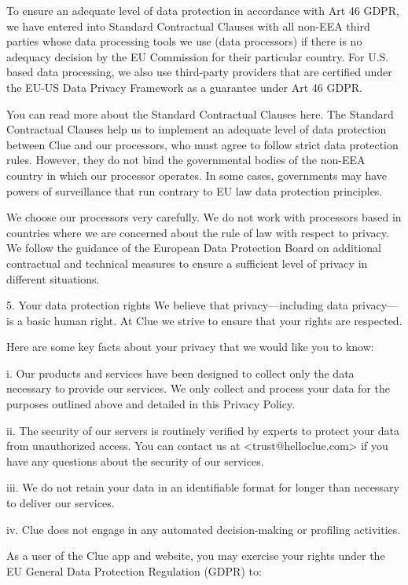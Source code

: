 To ensure an adequate level of data protection in accordance with Art 46 GDPR, we have entered into Standard Contractual Clauses with all non-EEA third parties whose data processing tools we use (data processors) if there is no adequacy decision by the EU Commission for their particular country. For U.S. based data processing, we also use third-party providers that are certified under the EU-US Data Privacy Framework as a guarantee under Art 46 GDPR.

You can read more about the Standard Contractual Clauses here. The Standard Contractual Clauses help us to implement an adequate level of data protection between Clue and our processors, who must agree to follow strict data protection rules. However, they do not bind the governmental bodies of the non-EEA country in which our processor operates. In some cases, governments may have powers of surveillance that run contrary to EU law data protection principles.

We choose our processors very carefully. We do not work with processors based in countries where we are concerned about the rule of law with respect to privacy. We follow the guidance of the European Data Protection Board on additional contractual and technical measures to ensure a sufficient level of privacy in different situations.

5. Your data protection rights
We believe that privacy—including data privacy—is a basic human right. At Clue we strive to ensure that your rights are respected.

Here are some key facts about your privacy that we would like you to know:

i. Our products and services have been designed to collect only the data necessary to provide our services. We only collect and process your data for the purposes outlined above and detailed in this Privacy Policy.

ii. The security of our servers is routinely verified by experts to protect your data from unauthorized access. You can contact us at <trust@helloclue.com> if you have any questions about the security of our services.

iii. We do not retain your data in an identifiable format for longer than necessary to deliver our services.

iv. Clue does not engage in any automated decision-making or profiling activities.

As a user of the Clue app and website, you may exercise your rights under the EU General Data Protection Regulation (GDPR) to:

